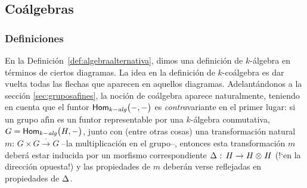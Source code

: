 \theoremstyle{plain}
\newtheorem{defCoalgebra}{Definici\'{o}n}[section]
\newtheorem{defBialgebra}[defCoalgebra]{Definici\'{o}n}
\newtheorem{teoIsomorfismoProductoTensorialDeMorfismosDeModulos}[defCoalgebra]%
	{Teorema}
\newtheorem{coroIsomorfismoProductoTensorialDeMorfismosDeModulos}%
	[defCoalgebra]{Corolario}
\newtheorem{propoAlgebraDual}[defCoalgebra]{Proposici\'{o}n}
\newtheorem{propoCoalgebraDual}[defCoalgebra]{Proposici\'{o}n}

\theoremstyle{definition}
\newtheorem{obsCoalgebra}[defCoalgebra]{Observaci\'{o}n}
\newtheorem{ejemploCoalgebra}[defCoalgebra]{Ejemplo}
\newtheorem{ejemploCoalgebraProductoTensorial}[defCoalgebra]{Ejemplo}
\newtheorem{ejemploAlgebraDual}[defCoalgebra]{Ejemplo}
\newtheorem{ejemploCoalgebraDualDeMatrices}[defCoalgebra]{Ejemplo}
\newtheorem{obsPolinomios}[defCoalgebra]{Observaci\'{o}n}
\newtheorem{obsBialgebraDeMatrices}[defCoalgebra]{Observaci\'{o}n}
\newtheorem{ejemploBialgebra}[defCoalgebra]{Ejemplo}


\subsection{Co\'{a}lgebras}\label{subsec:coalgebras:coalgebras}

\subsubsection{Definiciones}

En la Definici\'{o}n~\ref{def:algebraalternativa}, dimos una definici\'{o}n de
$k$-\'{a}lgebra en t\'{e}rminos de ciertos diagramas. La idea en la
definici\'{o}n de $k$-co\'{a}lgebra es dar vuelta todas las flechas que
aparecen en aquellos diagramas. Adelant\'{a}ndonos a la secci\'{o}n
\ref{sec:gruposafines}, la noci\'{o}n de co\'{a}lgebra aparece naturalmente,
teniendo en cuenta que el funtor $\mathsf{Hom}_{k-\mathit{alg}}\big(-,-\big)$ es
\emph{contra}variante en el primer lugar: si un grupo af\'{\i}n es un funtor
representable por una $k$-\'{a}lgebra conmutativa, $G=\mathsf{Hom}_{k-\mathit{alg}}\big(H,-\big)$,
junto con (entre otras cosas) una transformaci\'{o}n natural
$m:\,G\times G\xrightarrow\cdot G$ --la multiplicaci\'{o}n en el grupo--,
entonces esta transformaci\'{o}n $m$ deber\'{a} estar inducida por un morfismo
correspondiente $\Delta_{}:\,H\rightarrow H\otimes_{} H$ (!`en la direcci\'{o}n
opuesta!) y las propiedades de $m$ deber\'{a}n verse reflejadas en propiedades
de $\Delta_{}$.

